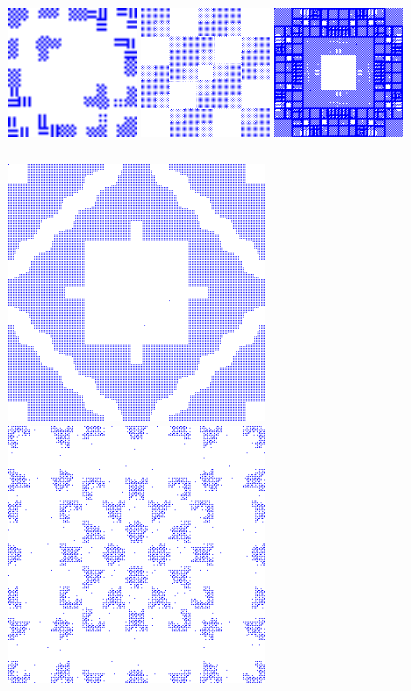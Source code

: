 \begin{frame}
  \includegraphics[width=3.4cm]{75-pretty}
  \includegraphics[width=3.4cm]{76-pretty}
  \includegraphics[width=3.4cm]{78-pretty}
\end{frame}
\begin{frame}
  \frametitle{\problemtitle}
  \includegraphics[width=6.8cm]{70-pretty}
  \includegraphics[width=6.8cm]{77-pretty}
\end{frame}
